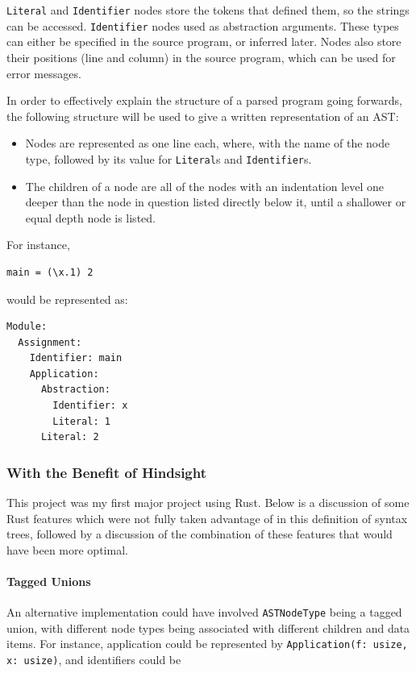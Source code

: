 \verb|Literal| and \verb|Identifier| nodes store the tokens that defined them, so the strings can be accessed. \verb|Identifier| nodes used as abstraction arguments. These types can either be specified in the source program, or inferred later. Nodes also store their positions (line and column) in the source program, which can be used for error messages. 

In order to effectively explain the structure of a parsed program going forwards, the following structure will be used to give a written representation of an AST:
\begin{itemize}
    \item Nodes are represented as one line each, where, with the name of the node type, followed by its value for \verb|Literal|s and \verb|Identifier|s.
    \item The children of a node are all of the nodes with an indentation level one deeper than the node in question listed directly below it, until a shallower or equal depth node is listed. 
\end{itemize}
\filbreak\noindent
For instance, 
\begin{lstlisting}
main = (\x.1) 2
\end{lstlisting}
would be represented as:
\begin{lstlisting}
Module:
  Assignment:
    Identifier: main
    Application:
      Abstraction:
        Identifier: x
        Literal: 1
      Literal: 2
\end{lstlisting}

\subsubsection{With the Benefit of Hindsight}
This project was my first major project using Rust. Below is a discussion of some Rust features which were not fully taken advantage of in this definition of syntax trees, followed by a discussion of the combination of these features that would have been more optimal. 

\paragraph{Tagged Unions}
An alternative implementation could have involved \verb|ASTNodeType| being a tagged union, with different node types being associated with different children and data items. For instance, application could be represented by \verb|Application(f: usize, x: usize)|, and identifiers could be 

